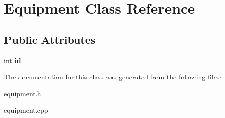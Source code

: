 \hypertarget{class_equipment}{\section{Equipment Class Reference}
\label{class_equipment}
}
\subsection*{Public Attributes}
\begin{DoxyCompactItemize}
\item 
\hypertarget{class_equipment_a77c1240ba821ee049a9834e06f2b52a9}{int {\bfseries id}}\label{class_equipment_a77c1240ba821ee049a9834e06f2b52a9}

\end{DoxyCompactItemize}


The documentation for this class was generated from the following files\-:\begin{DoxyCompactItemize}
\item 
equipment.\-h\item 
equipment.\-cpp\end{DoxyCompactItemize}

